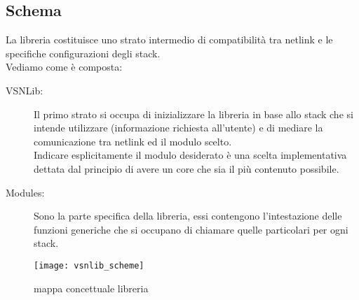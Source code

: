 \subsection{Schema}
La libreria costituisce uno strato  intermedio di compatibilit\`a tra netlink e le specifiche configurazioni degli stack.\\
Vediamo come \`e composta:
\begin{description}                     %
  \item[VSNLib:] Il primo strato si occupa di inizializzare la libreria in base allo stack che si intende utilizzare (informazione richiesta all'utente) e di mediare la comunicazione tra netlink ed il modulo scelto.\\
  Indicare esplicitamente il modulo desiderato \`e una scelta implementativa dettata dal principio di avere un core che sia il pi\`u contenuto possibile.
  \item[Modules:] Sono la parte specifica della libreria, essi contengono l'intestazione delle funzioni generiche che si occupano di chiamare quelle particolari per ogni stack.
\end{description}
\begin{figure}[h]                       %
\begin{center}                          %
\texttt{[image: vsnlib\_scheme]}%
%
\caption[mappa concettuale libreria]{mappa concettuale libreria}\label{fig:map}
\end{center}
\end{figure}
